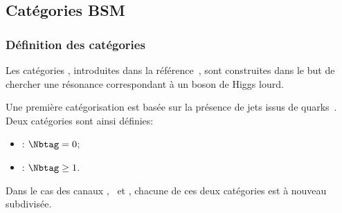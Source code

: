 \subsection{Catégories \og BSM \fg{}}\label{chapter-HTT_analysis-section-categorisation-BSM}
\subsubsection{Définition des catégories}
Les catégories \CATbsm, introduites dans la référence~\cite{CMS-PAS-HIG-17-020}, sont construites dans le but de chercher une résonance correspondant à un boson de Higgs lourd.
\par
Une première catégorisation est basée sur la présence de jets issus de quarks~\quarkb.
Deux catégories sont ainsi définies:
\begin{itemize}
\item \CATnobtag: $\Nbtag =0$;
\item \CATbtag: $\Nbtag\geq1$.
\end{itemize}
Dans le cas des canaux \mu\tauh, \ele\tauh\ et \ele\mu, chacune de ces deux catégories est à nouveau subdivisée.
